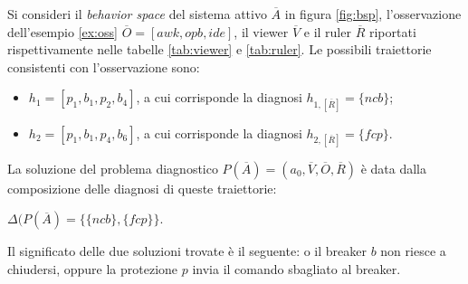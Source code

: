 \begin{ex} \label{ex:problem}
Si consideri il \emph{behavior space} del sistema attivo $\overline{A}$ in figura \ref{fig:bsp}, l'osservazione dell'esempio \ref{ex:oss} $\overline{O} = [awk, opb, ide]$, il viewer $\overline{V}$ e il ruler $\overline{R}$ riportati rispettivamente nelle tabelle \ref{tab:viewer} e \ref{tab:ruler}.
Le possibili traiettorie consistenti con l'osservazione sono:
\begin{itemize}
\item $h_1 = [p_1,b_1,p_2,b_4]$, a cui corrisponde la diagnosi $h_{1,[\overline{R}]} = \{\mathit{ncb}\}$;
\item $h_2 = [p_1,b_1,p_4,b_6]$, a cui corrisponde la diagnosi $h_{2,[\overline{R}]} = \{\mathit{fcp}\}$.
\end{itemize}
La soluzione del problema diagnostico $P(\overline{A}) = (a_0,\overline{V},\overline{O},\overline{R})$ è data dalla composizione delle diagnosi di queste traiettorie:
\begin{center}
$\Delta(P(\overline{A}) = \{\{\mathit{ncb}\},\{\mathit{fcp}\}\}$.
\end{center}
Il significato delle due soluzioni trovate è il seguente: o il breaker $b$ non riesce a chiudersi, oppure la protezione $p$ invia il comando sbagliato al breaker.  
\end{ex}


\newpage
